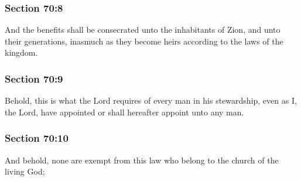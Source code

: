 	\subsubsection{Section 70:8} %
		\label{DC70-8}

		And the benefits shall be consecrated unto the inhabitants of Zion, and unto their generations, inasmuch as they become heirs according to the laws of the kingdom.


	\subsubsection{Section 70:9} %
		\label{DC70-9}

		Behold, this is what the Lord requires of every man in his stewardship, even as I, the Lord, have appointed or shall hereafter appoint unto any man.


	\subsubsection{Section 70:10} %
		\label{DC70-10}

		And behold, none are exempt from this law who belong to the church of the living God;


